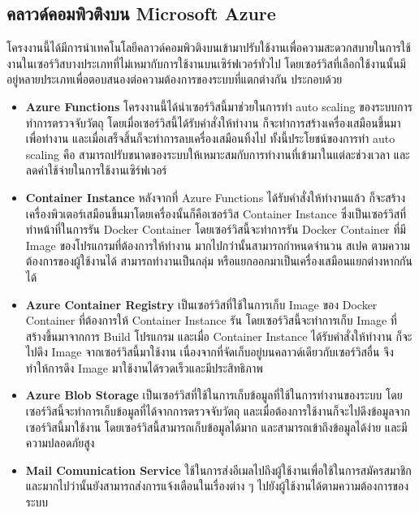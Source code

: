 \subsection{คลาวด์คอมพิวติงบน Microsoft Azure}
โครงงานนี้ได้มีการนำเทคโนโลยีคลาวด์คอมพิวติงบนเข้ามาปรับใช้งานเพื่อความสะดวกสบายในการใช้งานในเซอร์วิสบางประเภทที่ไม่เหมากับการใช้งานบนเซิร์ฟเวอร์ทั่วไป โดยเซอร์วิสที่เลือกใช้งานนั้นมีอยู่หลายประเภทเพื่อตอบสนองต่อความต้องการของระบบที่แตกต่างกัน ประกอบด้วย
\begin{itemize}
    \item \textbf{Azure Functions} โครงงานนี้ได้นำเซอร์วิสนี้มาช่วยในการทำ auto scaling ของระบบการทำการตรวจจับวัตถุ โดยเมื่อเซอร์วิสนี้ได้รับคำสั่งให้ทำงาน  ก็จะทำการสร้างเครื่องเสมือนขึ้นมา เพื่อทำงาน และเมื่อเสร็จสิ้นก็จะทำการลบเครื่องเสมือนทิ้งไป ทั้งนี้ประโยชน์ของการทำ auto scaling คือ สามารถปรับขนาดของระบบให้เหมาะสมกับการทำงานที่เข้ามาในแต่ละช่วงเวลา และลดค่าใช้จ่ายในการใช้งานเซิร์ฟเวอร์
    \item \textbf{Container Instance} หลังจากที่ Azure Functions ได้รับคำสั่งให้ทำงานแล้ว ก็จะสร้างเครื่องพิวเตอร์เสมือนขึ้นมาโดยเครื่องนั้นก็คือเซอร์วิส Container Instance ซึ่งเป็นเซอร์วิสที่ทำหน้าที่ในการรัน Docker Container โดยเซอร์วิสนี้จะทำการรัน Docker Container ที่มี Image ของโปรแกรมที่ต้องการให้ทำงาน มากไปกว่านั้นสามารถกำหนดจำนวน สเปค ตามความต้องการของผู้ใช้งานได้ สามารถทำงานเป็นกลุ่ม หรือแยกออกมาเป็นเครื่องเสมือนแยกต่างหากกันได้
    \item \textbf{Azure Container Registry} เป็นเซอร์วิสที่ใช้ในการเก็บ Image ของ Docker Container ที่ต้องการให้ Container Instance รัน โดยเซอร์วิสนี้จะทำการเก็บ Image ที่สร้างขึ้นมาจากการ Build โปรแกรม และเมื่อ Container Instance ได้รับคำสั่งให้ทำงาน ก็จะไปดึง Image จากเซอร์วิสนี้มาใช้งาน เนื่องจากที่จัดเก็บอยู่บนคลาวด์เดียวกับเซอร์วิสอื่น จึงทำให้การดึง Image มาใช้งานได้รวดเร็วและมีประสิทธิภาพ
    \item \textbf{Azure Blob Storage} เป็นเซอร์วิสที่ใช้ในการเก็บข้อมูลที่ใช้ในการทำงานของระบบ โดยเซอร์วิสนี้จะทำการเก็บข้อมูลที่ได้จากการตรวจจับวัตถุ และเมื่อต้องการใช้งานก็จะไปดึงข้อมูลจากเซอร์วิสนี้มาใช้งาน โดยเซอร์วิสนี้สามารถเก็บข้อมูลได้มาก และสามารถเข้าถึงข้อมูลได้ง่าย และมีความปลอดภัยสูง
    \item \textbf{Mail Comunication Service}
    ใช้ในการส่งอีเมลไปถึงผู้ใช้งานเพื่อใช้ในการสมัครสมาชิก และมากไปว่านั้นยังสามารถส่งการแจ้งเตือนในเรื่องต่าง ๆ ไปยังผู้ใช้งานได้ตามความต้องการของระบบ
\end{itemize}